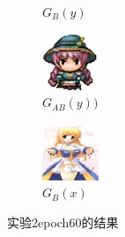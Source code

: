 \documentclass[twocolumn,11pt]{ctexart}
\begin{document}
\begin{figure}[htb]
\begin{subfigure}[b]{0.23\linewidth}
        \caption{$G_B(y)$}
      \end{subfigure}
      \begin{subfigure}[b]{0.23\linewidth}
        \includegraphics[width=\linewidth]{exp2_epoch060_rec_B.png}
        \caption{$G_{AB}(y))$}
      \end{subfigure}
      \begin{subfigure}[b]{0.23\linewidth}
        \includegraphics[width=\linewidth]{exp2_epoch060_idt_B.png}
        \caption{$G_B(x)$}
      \end{subfigure}
      \caption{实验2epoch60的结果}
      \label{fig:exp2epoch60}
\end{figure}
\end{document}
